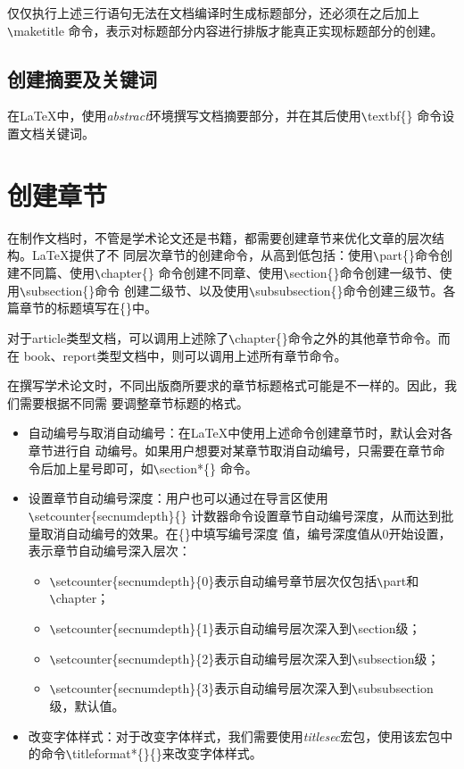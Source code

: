 仅仅执行上述三行语句无法在文档编译时生成标题部分，还必须在之后加上\verb|\|maketitle
命令，表示对标题部分内容进行排版才能真正实现标题部分的创建。

\subsection{创建摘要及关键词}
在LaTeX中，使用\emph{abstract}环境撰写文档摘要部分，并在其后使用\verb|\|textbf\{\}
命令设置文档关键词。

\section{创建章节}
在制作文档时，不管是学术论文还是书籍，都需要创建章节来优化文章的层次结构。LaTeX提供了不
同层次章节的创建命令，从高到低包括：使用\verb|\|part\{\}命令创建不同篇、使用\verb|\|chapter\{\}
命令创建不同章、使用\verb|\|section\{\}命令创建一级节、使用\verb|\|subsection\{\}命令
创建二级节、以及使用\verb|\|subsubsection\{\}命令创建三级节。各篇章节的标题填写在\{\}中。

对于article类型文档，可以调用上述除了\verb|\|chapter\{\}命令之外的其他章节命令。而在
book、report类型文档中，则可以调用上述所有章节命令。

在撰写学术论文时，不同出版商所要求的章节标题格式可能是不一样的。因此，我们需要根据不同需
要调整章节标题的格式。

\begin{itemize}
      \item 自动编号与取消自动编号：在LaTeX中使用上述命令创建章节时，默认会对各章节进行自
            动编号。如果用户想要对某章节取消自动编号，只需要在章节命令后加上星号即可，如\verb|\|section*\{\}
            命令。
      \item 设置章节自动编号深度：用户也可以通过在导言区使用\verb|\|setcounter\{secnumdepth\}\{\}
            计数器命令设置章节自动编号深度，从而达到批量取消自动编号的效果。在\{\}中填写编号深度
            值，编号深度值从0开始设置，表示章节自动编号深入层次：
            \begin{itemize}
                  \item \verb|\|setcounter\{secnumdepth\}\{0\}表示自动编号章节层次仅包括\verb|\|part和\verb|\|chapter；
                  \item \verb|\|setcounter\{secnumdepth\}\{1\}表示自动编号层次深入到\verb|\|section级；
                  \item \verb|\|setcounter\{secnumdepth\}\{2\}表示自动编号层次深入到\verb|\|subsection级；
                  \item \verb|\|setcounter\{secnumdepth\}\{3\}表示自动编号层次深入到\verb|\|subsubsection级，默认值。
            \end{itemize}
      \item 改变字体样式：对于改变字体样式，我们需要使用\emph{titlesec}宏包，使用该宏包中
            的命令\verb|\|titleformat*\{\}\{\}来改变字体样式。
\end{itemize}

